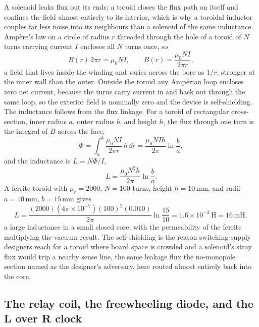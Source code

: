 A solenoid leaks flux out its ends; a toroid closes the flux path on itself
and confines the field almost entirely to its interior, which is why a
toroidal inductor couples far less noise into its neighbours than a
solenoid of the same inductance. Amp\`ere's law on a circle of radius $r$
threaded through the hole of a toroid of $N$ turns carrying current $I$
encloses all $N$ turns once, so
\[
B(r)\,2\pi r = \mu_0 N I, \qquad B(r) = \frac{\mu_0 N I}{2\pi r},
\]
a field that lives inside the winding and varies across the bore as $1/r$,
stronger at the inner wall than the outer. Outside the toroid any Amp\`erian
loop encloses zero net current, because the turns carry current in and back
out through the same loop, so the exterior field is nominally zero and the
device is self-shielding. The inductance follows from the flux linkage. For
a toroid of rectangular cross-section, inner radius $a$, outer radius $b$,
and height $h$, the flux through one turn is the integral of $B$ across the
face,
\[
\Phi = \int_a^b \frac{\mu_0 N I}{2\pi r}\,h\,\dd r = \frac{\mu_0 N I h}{
2\pi}\ln\frac{b}{a},
\]
and the inductance is $L = N\Phi/I$,
\[
L = \frac{\mu_0 N^{2} h}{2\pi}\ln\frac{b}{a}.
\]
A ferrite toroid with $\mu_r = 2000$, $N = 100$ turns, height $h = 10\,\si{
\milli\meter}$, and radii $a = 10\,\si{\milli\meter}$, $b = 15\,\si{\milli
\meter}$ gives
\[
L = \frac{(2000)(4\pi\times 10^{-7})(100)^{2}(0.010)}{2\pi}\ln\frac{15}{10}
= 1.6\times 10^{-2}\,\si{\henry} = 16\,\si{\milli\henry},
\]
a large inductance in a small closed core, with the permeability of the
ferrite multiplying the vacuum result. The self-shielding is the reason
switching-supply designers reach for a toroid where board space is crowded
and a solenoid's stray flux would trip a nearby sense line, the same
leakage flux the no-monopole section named as the designer's adversary,
here routed almost entirely back into the core.

\subsection{The relay coil, the freewheeling diode, and the L over R clock}

